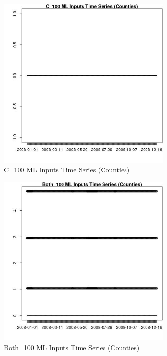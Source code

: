 \begin{figure} 
\centering  
\includegraphics[width=0.77\textwidth]{Code_Outputs/ML_input_report_ML_input_CountyGeometricCentroids_Locations_Dates_part_c_2008-01-01to2008-12-31_C_100TS.jpg} 
\caption{\label{fig:ML_input_report_ML_input_CountyGeometricCentroids_Locations_Dates_part_c_2008-01-01to2008-12-31C_100TS}C_100 ML Inputs Time Series (Counties)} 
\end{figure} 
 

\begin{figure} 
\centering  
\includegraphics[width=0.77\textwidth]{Code_Outputs/ML_input_report_ML_input_CountyGeometricCentroids_Locations_Dates_part_c_2008-01-01to2008-12-31_Both_100TS.jpg} 
\caption{\label{fig:ML_input_report_ML_input_CountyGeometricCentroids_Locations_Dates_part_c_2008-01-01to2008-12-31Both_100TS}Both_100 ML Inputs Time Series (Counties)} 
\end{figure} 
 

